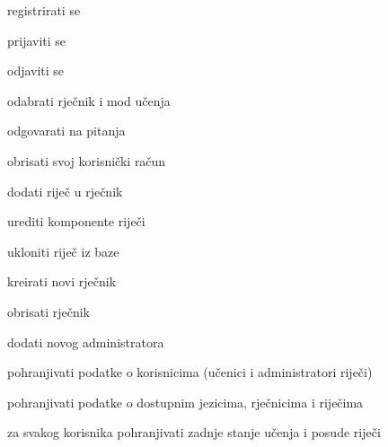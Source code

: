 			
			\begin{packed_enum}
				\item  {}
				
				\begin{packed_enum}
					
					\item registrirati se
					\item prijaviti se
					\item odjaviti se
%						
%				
					\item odabrati rječnik i mod učenja
					\item odgovarati na pitanja
					\item obrisati svoj korisnički račun
					
				\end{packed_enum}
			
				\item  {}
				
				\begin{packed_enum}
					
					\item dodati riječ u rječnik
					\item urediti komponente riječi
					\item ukloniti riječ iz baze
					\item kreirati novi rječnik
					\item obrisati rječnik
					\item dodati novog administratora
										
				\end{packed_enum}
				
				\item  {}
				
				\begin{packed_enum}
					
					\item pohranjivati podatke o korisnicima (učenici i administratori riječi)
					\item pohranjivati podatke o dostupnim jezicima, rječnicima i riječima
					\item za svakog korisnika pohranjivati zadnje stanje učenja i posude riječi
					

\end{packed_enum}
\end{packed_enum}
